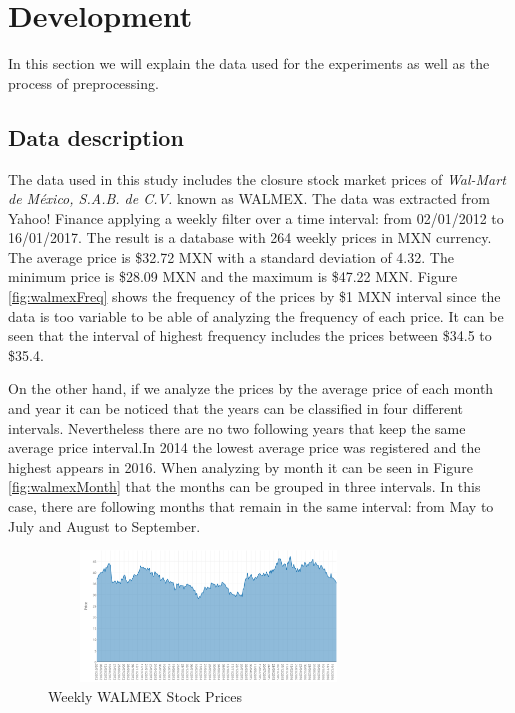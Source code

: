 \chapter{Development}
\label{ch:dev}

In this section we will explain the data used for the experiments as well as the process of preprocessing.

\section{Data description}
The data used in this study includes the closure stock market prices of \textit{Wal-Mart de México, S.A.B. de C.V.} known as WALMEX. The data was extracted from Yahoo! Finance applying a weekly filter over a time interval: from 02/01/2012 to 16/01/2017. The result is a database with 264 weekly prices in MXN currency. The average price is \$32.72 MXN with a standard deviation of 4.32. The minimum price is \$28.09 MXN and the maximum is \$47.22 MXN. Figure \ref{fig:walmexFreq} shows the frequency of the prices by \$1 MXN interval since the data is too variable to be able of analyzing the frequency of each price. It can be seen that the interval of highest frequency includes the prices between \$34.5 to \$35.4. 

On the other hand, if we analyze the prices by the average price of each month and year it can be noticed that the years can be classified in four different intervals. Nevertheless there are no two following years that keep the same average price interval.In 2014 the lowest average price was registered and the highest appears in 2016. When analyzing by month it can be seen in Figure \ref{fig:walmexMonth} that the months can be grouped in three intervals. In this case, there are following months that remain in the same interval: from May to July and August to September. 

 
\begin{figure}
\label{fig:walmexComp}
\center
\includegraphics[width=8.5cm,height=3.5cm]{Figures/wamexCompleto.PNG}
\caption{Weekly WALMEX Stock Prices}
\end{figure}

